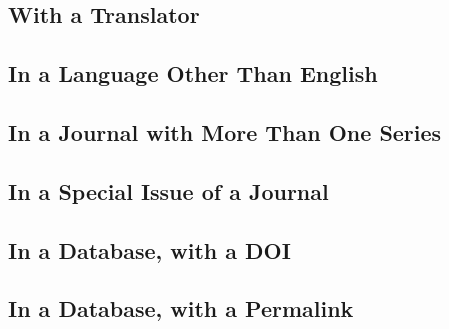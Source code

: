 \documentclass{article}
\begin{document}
\subsection{With a Translator} %
\label{sub:with_a_translator}
\begin{refsection}
	\printbibliography[heading=none]
\end{refsection}
\subsection{In a Language Other Than English} %
\label{sub:in_a_language_other_than_english}
\begin{refsection}
	\printbibliography[heading=none]
\end{refsection}
\subsection{In a Journal with More Than One Series} %
\label{sub:in_a_journal_with_more_than_one_series}
\begin{refsection}
	\printbibliography[heading=none]
\end{refsection}
\subsection{In a Special Issue of a Journal} %
\label{sub:in_a_special_issue_of_a_journal}
\begin{refsection}
	\printbibliography[heading=none]
\end{refsection}
\subsection{In a Database, with a DOI} %
\label{sub:in_a_database_with_a_doi}
\begin{refsection}
	\printbibliography[heading=none]
\end{refsection}
\subsection{In a Database, with a Permalink} %
\label{sub:in_a_database_with_a_permalink}
\begin{refsection}
	\printbibliography[heading=none]
\end{refsection}
\end{document}
